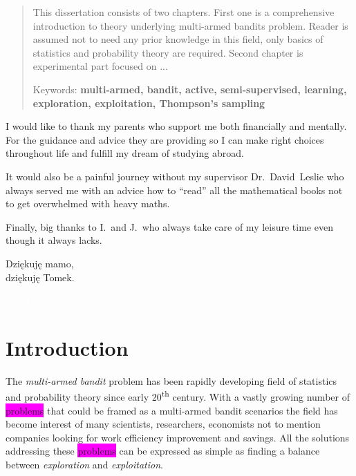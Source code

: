 \documentclass[12pt, a4paper, pdflatex, leqno]{report}
\newcommand{\ts}{\textsuperscript}
\newenvironment{dedication}
  {\clearpage           %
   \thispagestyle{empty}%
   \vspace*{\stretch{1}}%
   \itshape             %
   \raggedright          %
   \par\setlength{\leftskip}{0.3\textwidth}\noindent\ignorespaces
  }
  {\par %
   \vspace{\stretch{3}} %
   \clearpage           %
  }
\begin{document}
\begin{abstract}
\thispagestyle{empty}%
This dissertation consists of two chapters. First one is a comprehensive introduction to theory underlying multi-armed bandits problem. Reader is assumed not to need any prior knowledge in this field, only basics of statistics and probability theory are required. Second chapter is experimental part focused on ...
\begin{center}
Keywords: \textbf{multi-armed, bandit, active, semi-supervised, learning, exploration, exploitation, Thompson's sampling}
\end{center}
\end{abstract}

\begin{dedication}
I would like to thank my parents who support me both financially and mentally. For the guidance and advice they are providing so I can make right choices throughout life and fulfill my dream of studying abroad.\newline

It would also be a painful journey without my supervisor Dr.~David~Leslie who always served me with an advice how to ``read'' all the mathematical books not to get overwhelmed with heavy maths.\newline

Finally, big thanks to I.\ and J.\ who always take care of my leisure time even though it always lacks.\\[2cm]


\begin{flushright}
Dzi\k{e}kuj\k{e} mamo,\\
dzi\k{e}kuj\k{e} Tomek.
\end{flushright}



\textcolor{white}{found me!}



\end{dedication}


\newpage
\tableofcontents
\thispagestyle{empty}
\cleardoublepage
\pagestyle{plain}
\setcounter{page}{1}


\chapter{Introduction}
The \emph{multi-armed bandit} problem has been rapidly developing field of statistics and probability theory since early 20\ts{th} century. With a vastly growing number of \colorbox{magenta}{problems} that could be framed as a multi-armed bandit scenarios the field has become interest of many scientists, researchers, economists not to mention companies looking for work efficiency improvement and savings. All the solutions addressing these \colorbox{magenta}{problems} can be expressed as simple as finding a balance between \emph{exploration} and \emph{exploitation}.
\end{document}
